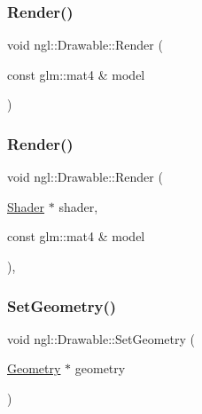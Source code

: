 \mbox{\label{classngl_1_1_drawable_a2f4d315d693b759a9b427977ef503c39}} 
\subsubsection{\texorpdfstring{Render()}{Render()}\hspace{0.1cm}{\footnotesize\ttfamily [1/2]}}
{\footnotesize\ttfamily void ngl\+::\+Drawable\+::\+Render (\begin{DoxyParamCaption}\item[{const glm\+::mat4 \&}]{model }\end{DoxyParamCaption})\hspace{0.3cm}{\ttfamily [virtual]}}

\mbox{\label{classngl_1_1_drawable_a11be86a78602d58bda7ce1331e23658c}} 
\subsubsection{\texorpdfstring{Render()}{Render()}\hspace{0.1cm}{\footnotesize\ttfamily [2/2]}}
{\footnotesize\ttfamily void ngl\+::\+Drawable\+::\+Render (\begin{DoxyParamCaption}\item[{\mbox{\hyperlink{classngl_1_1_shader}{Shader}} $\ast$}]{shader,  }\item[{const glm\+::mat4 \&}]{model }\end{DoxyParamCaption})\hspace{0.3cm}{\ttfamily [protected]}, {\ttfamily [virtual]}}

\mbox{\label{classngl_1_1_drawable_a92fc7514130187ae6fa4e7754bcbf068}} 
\subsubsection{\texorpdfstring{Set\+Geometry()}{SetGeometry()}}
{\footnotesize\ttfamily void ngl\+::\+Drawable\+::\+Set\+Geometry (\begin{DoxyParamCaption}\item[{\mbox{\hyperlink{classngl_1_1_geometry}{Geometry}} $\ast$}]{geometry }\end{DoxyParamCaption})}

